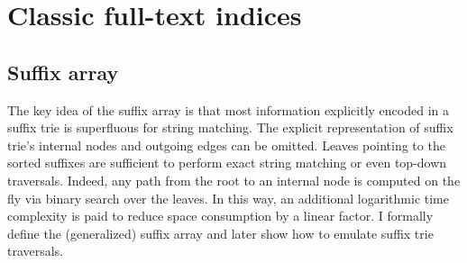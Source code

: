 \section{Classic full-text indices}

\subsection{Suffix array}

The key idea of the suffix array \citep{Manber1990} is that most information explicitly encoded in a suffix trie is superfluous for string matching.
The explicit representation of suffix trie's internal nodes and outgoing edges can be omitted.
Leaves pointing to the sorted suffixes are sufficient to perform exact string matching or even top-down traversals.
Indeed, any path from the root to an internal node is computed on the fly via binary search over the leaves.
In this way, an additional logarithmic time complexity is paid to reduce space consumption by a linear factor.
I formally define the (generalized) suffix array and later show how to emulate suffix trie traversals.



